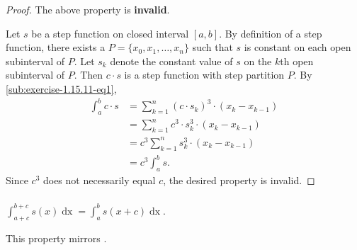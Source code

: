 \documentclass{report}
\begin{document}
  \begin{proof}
    The above property is \textbf{invalid}.

    \vspace{6pt}

    Let $s$ be a step function on closed interval $[a, b]$.
    By definition of a step function, there exists a 
      $P = \{x_0, x_1, \ldots, x_n\}$ such that $s$ is constant on each open
      subinterval of $P$.
    Let $s_k$ denote the constant value of $s$ on the $k$th open subinterval of
      $P$.
    Then $c \cdot s$ is a step function with step partition $P$.
    By \eqref{sub:exercise-1.15.11-eq1},
      \begin{align*}
        \int_a^b c \cdot s
          & = \sum_{k=1}^n (c \cdot s_k)^3 \cdot (x_k - x_{k-1}) \\
          & = \sum_{k=1}^n c^3 \cdot s_k^3 \cdot (x_k - x_{k-1}) \\
          & = c^3 \sum_{k=1}^n s_k^3 \cdot (x_k - x_{k-1}) \\
          & = c^3 \int_a^b s.
      \end{align*}
    Since $c^3$ does not necessarily equal $c$, the desired property is invalid.
  \end{proof}

\subsubsection{}%

  $\int_{a+c}^{b+c} s(x) \mathop{dx} = \int_a^b s(x + c) \mathop{dx}$.

  \begin{note}
    This property mirrors .
  \end{note}
\end{document}
